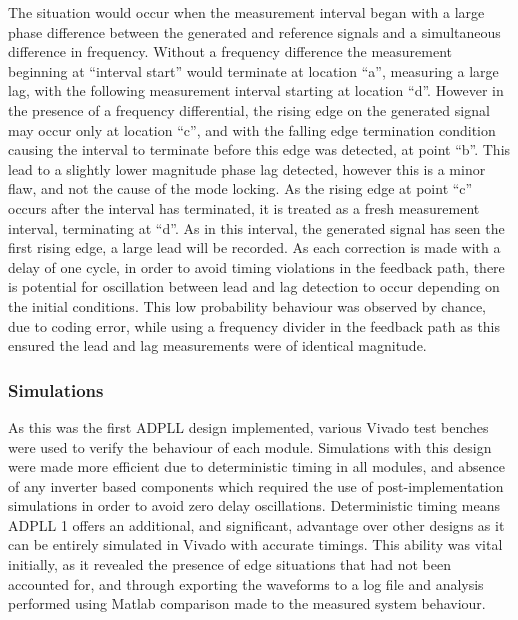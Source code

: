 The situation would occur when the measurement interval began with a large phase difference between the generated and reference signals and a simultaneous difference in frequency. Without a frequency difference the measurement beginning at ``interval start'' would terminate at location ``a'', measuring a large lag, with the following measurement interval starting at location ``d''. However in the presence of a frequency differential, the rising edge on the generated signal may occur only at location ``c'', and with the falling edge termination condition causing the interval to terminate before this edge was detected, at point ``b''. This lead to a slightly lower magnitude phase lag detected, however this is a minor flaw, and not the cause of the mode locking. As the rising edge at point ``c'' occurs after the interval has terminated, it is treated as a fresh measurement interval, terminating at ``d''. As in this interval, the generated signal has seen the first rising edge, a large lead will be recorded. As each correction is made with a delay of one cycle, in order to avoid timing violations in the feedback path, there is potential for oscillation between lead and lag detection to occur depending on the initial conditions. This low probability behaviour was observed by chance, due to coding error, while using a frequency divider in the feedback path as this ensured the lead and lag measurements were of identical magnitude. 

\subsubsection{Simulations}
As this was the first \ac{ADPLL} design implemented, various Vivado test benches were used to verify the behaviour of each module. Simulations with this design were made more efficient due to deterministic timing in all modules, and absence of any inverter based components which required the use of post-implementation simulations in order to avoid zero delay oscillations. Deterministic timing means \ac{ADPLL} 1 offers an additional, and significant, advantage over other designs as it can be entirely simulated in Vivado with accurate timings. This ability was vital initially, as it revealed the presence of edge situations that had not been accounted for, and through exporting the waveforms to a log file and analysis performed using Matlab comparison made to the measured system behaviour.

